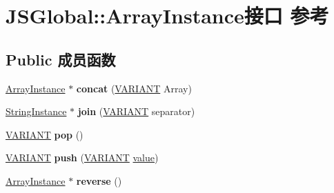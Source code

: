 \hypertarget{interface_j_s_global_1_1_array_instance}{}\section{J\+S\+Global\+:\+:Array\+Instance接口 参考}
\label{interface_j_s_global_1_1_array_instance}
\subsection*{Public 成员函数}
\begin{DoxyCompactItemize}
\item 
\mbox{\label{interface_j_s_global_1_1_array_instance_a95d423fef6a9cfc47d9c71203a67e582}} 
\hyperlink{interface_j_s_global_1_1_array_instance}{Array\+Instance} $\ast$ {\bfseries concat} (\hyperlink{structtag_v_a_r_i_a_n_t}{V\+A\+R\+I\+A\+NT} Array)
\item 
\mbox{\label{interface_j_s_global_1_1_array_instance_adb6af5b717746906f26361064ccde5c4}} 
\hyperlink{interface_j_s_global_1_1_string_instance}{String\+Instance} $\ast$ {\bfseries join} (\hyperlink{structtag_v_a_r_i_a_n_t}{V\+A\+R\+I\+A\+NT} separator)
\item 
\mbox{\label{interface_j_s_global_1_1_array_instance_a4cd005472a552bc4aef4b05b61366cfd}} 
\hyperlink{structtag_v_a_r_i_a_n_t}{V\+A\+R\+I\+A\+NT} {\bfseries pop} ()
\item 
\mbox{\label{interface_j_s_global_1_1_array_instance_a300ce0c314111b165ca02c852982d82d}} 
\hyperlink{structtag_v_a_r_i_a_n_t}{V\+A\+R\+I\+A\+NT} {\bfseries push} (\hyperlink{structtag_v_a_r_i_a_n_t}{V\+A\+R\+I\+A\+NT} \hyperlink{unionvalue}{value})
\item 
\mbox{\label{interface_j_s_global_1_1_array_instance_ab27911aed0a509052042d789cbcfb3de}} 
\hyperlink{interface_j_s_global_1_1_array_instance}{Array\+Instance} $\ast$ {\bfseries reverse} ()
\item 
\mbox{\label{interface_j_s_global_1_1_array_instance_a615e1e8caf61c5f19a79a4063bea1120}} 

\end{DoxyCompactItemize}
